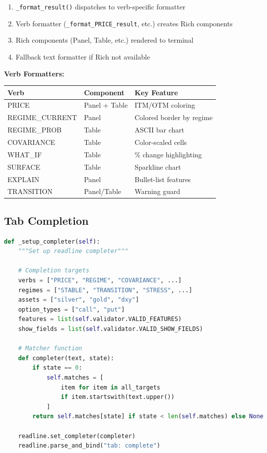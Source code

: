\documentclass[12pt,oneside,openany]{book}
\begin{document}
\begin{enumerate}
    \item \texttt{\_format\_result()} dispatches to verb-specific formatter
    \item Verb formatter (\texttt{\_format\_PRICE\_result}, etc.) creates Rich components
    \item Rich components (Panel, Table, etc.) rendered to terminal
    \item Fallback text formatter if Rich not available
\end{enumerate}

\textbf{Verb Formatters:}

\begin{table}[H]
\centering
\begin{tabular}{|l|l|l|}
\toprule
\textbf{Verb} & \textbf{Component} & \textbf{Key Feature} \\
\midrule
PRICE & Panel + Table & ITM/OTM coloring \\
REGIME\_CURRENT & Panel & Colored border by regime \\
REGIME\_PROB & Table & ASCII bar chart \\
COVARIANCE & Table & Color-scaled cells \\
WHAT\_IF & Table & \% change highlighting \\
SURFACE & Table & Sparkline chart \\
EXPLAIN & Panel & Bullet-list features \\
TRANSITION & Panel/Table & Warning guard \\
\bottomrule
\end{tabular}
\end{table}

\subsection{Tab Completion}

\begin{lstlisting}[language=Python]
def _setup_completer(self):
    """Set up readline completer"""

    # Completion targets
    verbs = ["PRICE", "REGIME", "COVARIANCE", ...]
    regimes = ["STABLE", "TRANSITION", "STRESS", ...]
    assets = ["silver", "gold", "dxy"]
    option_types = ["call", "put"]
    features = list(self.validator.VALID_FEATURES)
    show_fields = list(self.validator.VALID_SHOW_FIELDS)

    # Matcher function
    def completer(text, state):
        if state == 0:
            self.matches = [
                item for item in all_targets
                if item.startswith(text.upper())
            ]
        return self.matches[state] if state < len(self.matches) else None

    readline.set_completer(completer)
    readline.parse_and_bind("tab: complete")
\end{lstlisting}
\end{document}
